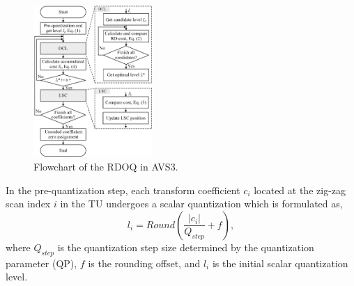 \documentclass[lettersize,journal]{IEEEtran}
\begin{document}
\begin{figure}[!t]
	\centering
	\centerline{\includegraphics[width=0.40\textwidth]{figure/OriRDOQ.png}}
    \vspace{-5pt}
	\caption{Flowchart of the RDOQ in AVS3.}
	\label{rdoq process} %
\end{figure}
In the pre-quantization step, each transform coefficient $c_{i}$ located at the zig-zag scan index $i$ in the TU undergoes a scalar quantization which is formulated as, 
\begin{equation}
\label{round}
l _{i} = Round\left ( \frac{\left | c_{i}  \right | }{Q_{step} } +  f \right ),
\end{equation}
where $Q_{step}$ is the quantization step size determined by the quantization parameter (QP), $f$ is the rounding offset, and $l _{i}$ is the initial scalar quantization level. 
\end{document}

